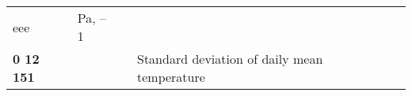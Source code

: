 \begin{longtable}[]{@{}lllll@{}}
\begin{minipage}[t]{0.17\columnwidth}
eee\strut
\end{minipage} & \begin{minipage}[t]{0.17\columnwidth}\raggedright
Pa, --1\strut
\end{minipage}\tabularnewline
\begin{minipage}[t]{0.17\columnwidth}\raggedright
\textbf{0 12 151}\strut
\end{minipage} & \begin{minipage}[t]{0.17\columnwidth}\raggedright
\strut
\end{minipage} & \begin{minipage}[t]{0.17\columnwidth}\raggedright
\strut
\end{minipage} & \begin{minipage}[t]{0.17\columnwidth}\raggedright
Standard deviation of daily mean temperature


\end{minipage}
\end{longtable}
